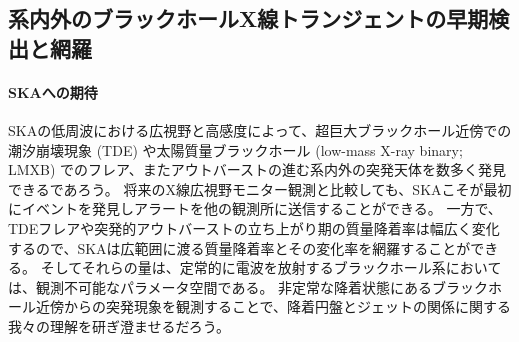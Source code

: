 \subsection{系内外のブラックホールX線トランジェントの早期検出と網羅}
\label{c09.s2.ss12}

\paragraph{SKAへの期待}

SKAの低周波における広視野と高感度によって、超巨大ブラックホール近傍での潮汐崩壊現象 (TDE) や太陽質量ブラックホール (low-mass X-ray binary; LMXB) でのフレア、またアウトバーストの進む系内外の突発天体を数多く発見できるであろう。
将来のX線広視野モニター観測と比較しても、SKAこそが最初にイベントを発見しアラートを他の観測所に送信することができる。
一方で、TDEフレアや突発的アウトバーストの立ち上がり期の質量降着率は幅広く変化するので、SKAは広範囲に渡る質量降着率とその変化率を網羅することができる。
そしてそれらの量は、定常的に電波を放射するブラックホール系においては、観測不可能なパラメータ空間である。
非定常な降着状態にあるブラックホール近傍からの突発現象を観測することで、降着円盤とジェットの関係に関する我々の理解を研ぎ澄ませるだろう。

